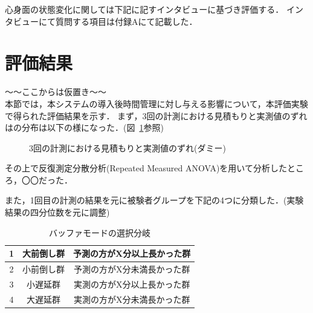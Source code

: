 心身面の状態変化に関しては下記に記すインタビューに基づき評価する．
インタビューにて質問する項目は付録Aにて記載した．%

\section{評価結果}
〜〜ここからは仮置き〜〜\\
本節では，本システムの導入後時間管理に対し与える影響について，本評価実験で得られた評価結果を示す．
まず，3回の計測における見積もりと実測値のずれはの分布は以下の様になった．(図~\ref{fig:hakohige}参照)

\begin{figure}[hb]
	\begin{center}
	\caption{3回の計測における見積もりと実測値のずれ(ダミー)}
	\label{fig:hakohige}
	\end{center}
\end{figure}

その上で反復測定分散分析(Repeated Measured ANOVA)を用いて分析したところ，〇〇だった．

また，1回目の計測の結果を元に被験者グループを下記の4つに分類した．(実験結果の四分位数を元に調整)

\begin{table}[htb]
  \begin{center}
  \begin{tabular}{|c|c|c|} \hline
    1 & 大前倒し群 & 予測の方がX分以上長かった群  \\ \hline
    2 & 小前倒し群 & 予測の方がX分未満長かった群  \\ \hline
    3 & 小遅延群 & 実測の方がX分以上長かった群  \\ \hline
    4 & 大遅延群 & 実測の方がX分未満長かった群  \\ \hline 
  \end{tabular}
    \caption{バッファモードの選択分岐}
    \label{tb:buffer}
  \end{center}
\end{table}

